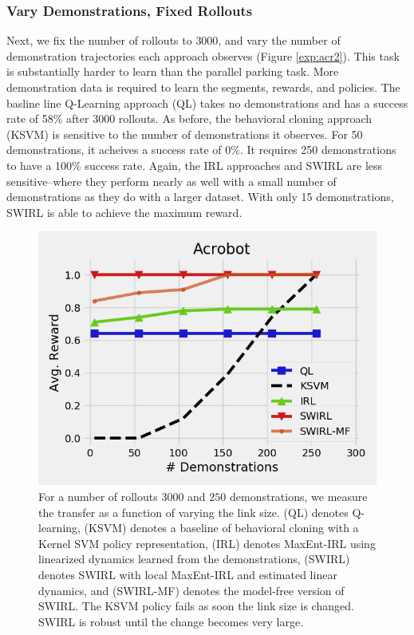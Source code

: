 \subsubsection{Vary Demonstrations, Fixed Rollouts}
Next, we fix the number of rollouts to $3000$, and vary the number of demonstration trajectories each approach observes (Figure \ref{exp:acr2}).
This task is substantially harder to learn than the parallel parking task.
More demonstration data is required to learn the segments, rewards, and policies.
The basline line Q-Learning approach (QL) takes no demonstrations and has a success rate of 58\% after 3000 rollouts.
As before, the behavioral cloning approach (KSVM) is sensitive to the number of demonstrations it observes. 
For 50 demonstrations, it acheives a success rate of 0\%.
It requires 250 demonstrations to have a 100\% success rate.
Again, the IRL approaches and SWIRL are less sensitive--where they perform nearly as well with a small number of demonstrations as they do with a larger dataset.
With only 15 demonstrations, SWIRL is able to achieve the maximum reward.


\begin{figure}[t]
\centering
 \includegraphics[width=\columnwidth]{new-exp/acr2.png}
 \caption{For a number of rollouts $3000$ and $250$ demonstrations, we measure the transfer as a function of varying the link size. (QL) denotes Q-learning, (KSVM) denotes a baseline of behavioral cloning with a Kernel SVM policy representation, (IRL) denotes MaxEnt-IRL using linearized dynamics learned from the demonstrations, (SWIRL) denotes SWIRL with local MaxEnt-IRL and estimated linear dynamics, and (SWIRL-MF) denotes the model-free version of SWIRL. The KSVM policy fails as soon the link size is changed. SWIRL is robust until the change becomes very large.  \label{exp:acr3}}
\end{figure}


